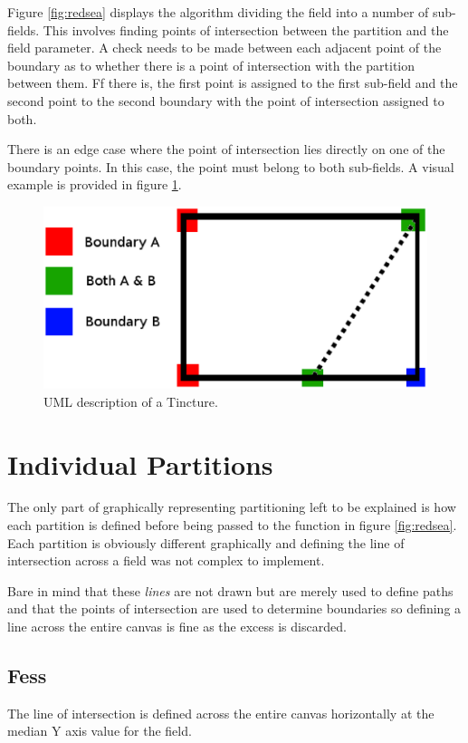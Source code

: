 Figure \ref{fig:redsea} displays the algorithm dividing the field into a number of sub-fields.  This involves finding points of intersection between the partition and the field parameter.  A check needs to be made between each adjacent point of the boundary as to whether there is a point of intersection with the partition between them. Ff there is, the first point is assigned to the first sub-field and the second point to the second boundary with the point of intersection assigned to both. 

There  is an edge case where the point of intersection lies directly on one of the boundary points.  In this case, the point must belong to both sub-fields.  A visual example is provided in figure \ref{fig:bounds}.


\begin{figure}[H]
  \centering
    \includegraphics[width=\textwidth]{graphics/images/bounds.eps}
  \caption{UML description of a Tincture.}
  \label{fig:bounds}
  
\end{figure}

\section{Individual Partitions}
The only part of graphically representing partitioning left to be explained is how each partition is defined before being passed to the function in figure \ref{fig:redsea}.  Each partition is obviously different graphically and defining the line of intersection across a field was not complex to implement.

Bare in mind that these \emph{lines} are not drawn but are merely used to define paths and that the points of intersection are used to determine boundaries so defining a line across the entire canvas is fine as the excess is discarded. 

\subsection{Fess}
The line of intersection is defined across the entire canvas horizontally at the median Y axis value for the field. 
